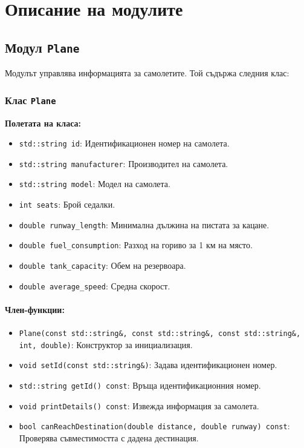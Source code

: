 \documentclass[a4paper,12pt]{article}
\begin{document}
\section{Описание на модулите}
\subsection{Модул \texttt{Plane}}
Модулът управлява информацията за самолетите. Той съдържа следния клас:

\subsubsection*{Клас \texttt{Plane}}
\textbf{Полетата на класа:}
\begin{itemize}
    \item \texttt{std::string id}: Идентификационен номер на самолета.
    \item \texttt{std::string manufacturer}: Производител на самолета.
    \item \texttt{std::string model}: Модел на самолета.
    \item \texttt{int seats}: Брой седалки.
    \item \texttt{double runway\_length}: Минимална дължина на пистата за кацане.
    \item \texttt{double fuel\_consumption}: Разход на гориво за 1 км на място.
    \item \texttt{double tank\_capacity}: Обем на резервоара.
    \item \texttt{double average\_speed}: Средна скорост.
\end{itemize}

\paragraph*{Член-функции:}
\begin{itemize}
    \item \texttt{Plane(const std::string\&, const std::string\&, const std::string\&, int, double)}: Конструктор за инициализация.
    \item \texttt{void setId(const std::string\&)}: Задава идентификационен номер.
    \item \texttt{std::string getId() const}: Връща идентификационния номер.
    \item \texttt{void printDetails() const}: Извежда информация за самолета.
    \item \texttt{bool canReachDestination(double distance, double runway) const}: Проверява съвместимостта с дадена дестинация.
\end{itemize}
\end{document}
